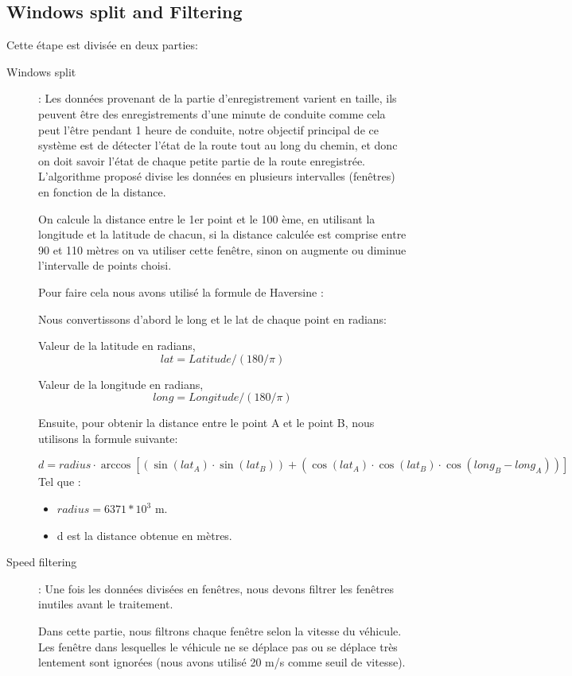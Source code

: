 \subsection{Windows split and Filtering}
Cette étape est divisée en deux parties:
\begin{description}
  \item[Windows split]:  Les données provenant de la partie d’enregistrement varient en taille, ils peuvent être des enregistrements d’une minute de conduite comme cela peut l’être pendant 1 heure de conduite, notre objectif principal de ce système est de détecter l’état de la route tout au long du chemin, et donc on doit savoir l'état de chaque petite partie de la route enregistrée. L’algorithme proposé divise les données en plusieurs intervalles (fenêtres) en fonction de la distance.
  
  On calcule la distance entre le 1er point et le 100 ème, en utilisant la longitude et la latitude de chacun, si la distance calculée est comprise entre 90 et 110 mètres on va utiliser cette fenêtre, sinon on augmente ou diminue l'intervalle de points choisi.

  Pour faire cela nous avons utilisé la formule de Haversine \cite{HaversineFormula2020}:

  Nous convertissons d'abord le long et le lat de chaque point en radians:

  Valeur de la latitude en radians, \[lat = Latitude / (180/\pi)\]

  Valeur de la longitude en radians, \[long = Longitude / (180/\pi)\] 


  Ensuite, pour obtenir la distance entre le point A et le point B, nous utilisons la formule suivante:

   \[
    d = radius   \cdot \arccos
    \left[
        \left(
            \sin(lat_{A}) \cdot \sin(lat_{B})
        \right)
        + 
        \left(
            \cos(lat_{A}) \cdot \cos(lat_{B}) \cdot \cos(long_{B} - long_{A})
        \right)
        \right]
\]
Tel que : 
\renewcommand{\labelitemi}{$\bullet$}
\begin{itemize}
  \item $radius  = 6371 * 10^{3} $ m.
  \item d est la distance obtenue en mètres.
\end{itemize}
 
\item[Speed filtering]: Une fois les données divisées en fenêtres, nous devons filtrer les fenêtres inutiles avant le traitement. 

Dans cette partie, nous filtrons chaque fenêtre  selon la vitesse du véhicule. Les fenêtre dans lesquelles le véhicule ne se déplace pas ou se déplace très lentement sont ignorées (nous avons utilisé 20 m/s comme seuil de vitesse).

\end{description}

